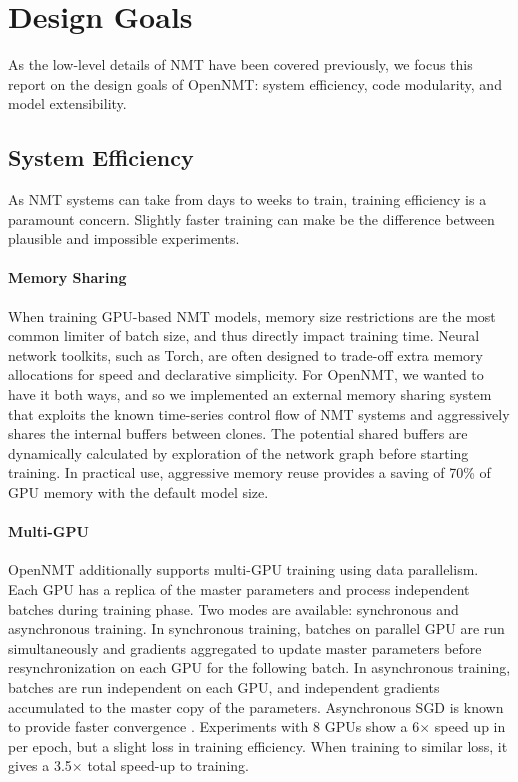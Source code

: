 \documentclass[11pt,a4paper]{article}
\begin{document}
\section{Design Goals}


As the low-level details of NMT have been covered previously, we focus
this report on the design goals of OpenNMT: system efficiency, code modularity, and model
extensibility.

\subsection{System Efficiency}

As NMT systems can take from days to weeks to train, training
efficiency is a paramount concern. Slightly faster training can make be the difference between
plausible and impossible experiments.

\paragraph{Memory Sharing}

When training GPU-based NMT models, memory size restrictions are the
most common limiter of batch size, and thus directly impact training
time. Neural network toolkits, such as Torch, are often designed to
trade-off extra memory allocations for speed and declarative
simplicity. For OpenNMT, we wanted to have it both ways, and so we
implemented an external memory sharing system that exploits the known
time-series control flow of NMT systems and aggressively shares the
internal buffers between clones. The potential shared buffers are
dynamically calculated by exploration of the network graph before
starting training. In practical use, aggressive memory reuse provides
a saving of 70\% of GPU memory with the default model size.

\paragraph{Multi-GPU} OpenNMT additionally supports multi-GPU training
using data parallelism. Each GPU has a replica of the master
parameters and process independent batches during training phase.  Two
modes are available: synchronous and asynchronous training.  In
synchronous training, batches on parallel GPU are run simultaneously
and gradients aggregated to update master parameters before
resynchronization on each GPU for the following batch.  In
asynchronous training, batches are run independent on each GPU, and
independent gradients accumulated to the master copy of the
parameters. Asynchronous SGD is known to provide faster convergence
\cite{dean2012large}. Experiments with 8 GPUs show a 6$\times$ speed up in 
per epoch, but a slight loss in training efficiency. When training to similar
loss, it gives a 3.5$\times$ total speed-up to training.
\end{document}
